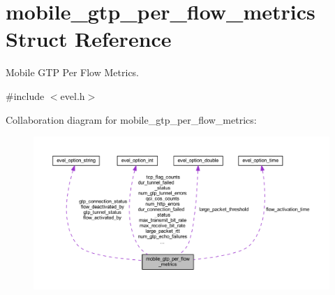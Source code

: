 \hypertarget{structmobile__gtp__per__flow__metrics}{}\section{mobile\+\_\+gtp\+\_\+per\+\_\+flow\+\_\+metrics Struct Reference}
\label{structmobile__gtp__per__flow__metrics}


Mobile G\+TP Per Flow Metrics.  




{\ttfamily \#include $<$evel.\+h$>$}



Collaboration diagram for mobile\+\_\+gtp\+\_\+per\+\_\+flow\+\_\+metrics\+:
\nopagebreak
\begin{figure}[H]
\begin{center}
\leavevmode
\includegraphics[width=350pt]{structmobile__gtp__per__flow__metrics__coll__graph}
\end{center}
\end{figure}
